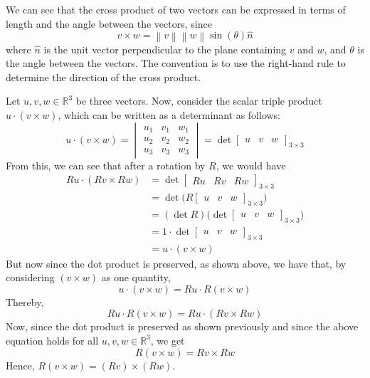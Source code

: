We can see that the cross product of two vectors can be expressed in terms of length and the angle between the vectors, since
\[
    v \times w = \left \| v \right \| \left \| w \right \| \sin(\theta) \hat{n}
\]
where \( \hat{n} \) is the unit vector perpendicular to the plane containing \( v \) and \( w \), and \( \theta \) is the angle between the vectors.
The convention is to use the right-hand rule to determine the direction of the cross product.

Let \( u, v, w \in \mathbb{R}^{3} \) be three vectors.
Now, consider the scalar triple product \( u \cdot (v \times w) \), which can be written as a determinant as follows:
\[
    u \cdot (v \times w)
    =
    \begin{vmatrix}
        u_{1} & v_{1} & w_{1} \\
        u_{2} & v_{2} & w_{2} \\
        u_{3} & v_{3} & w_{3}
    \end{vmatrix}
    =
    \det
    \begin{bmatrix}
        u & v & w
    \end{bmatrix}_{3 \times 3}
\]
From this, we can see that after a rotation by \( R \), we would have
\begin{align*}
    R u \cdot (R v \times R w)
     & =
    \det
    \begin{bmatrix}
        R u & R v & R w
    \end{bmatrix}_{3 \times 3}
    \\ & =
    \det \Big(
    R \begin{bmatrix}
          u & v & w
      \end{bmatrix}_{3 \times 3}
    \Big)
    \\ & =
    (\det R)
    \Big( \det
    \begin{bmatrix}
        u & v & w
    \end{bmatrix}_{3 \times 3} \Big)
    \\ & =
    1 \cdot
    \det
    \begin{bmatrix}
        u & v & w
    \end{bmatrix}_{3 \times 3}
    \\ & =
    u \cdot (v \times w)
\end{align*}
But now since the dot product is preserved, as shown above, we have that, by considering \( (v \times w) \) as one quantity,
\[
    u \cdot (v \times w)
    =
    R u \cdot R (v \times w)
\]
Thereby,
\[
    R u \cdot R (v \times w)
    =
    R u \cdot (R v \times R w)
\]
Now, since the dot product is preserved as shown previously and since the above equation holds for all \( u, v, w \in \mathbb{R}^{3} \), we get
\[
    R (v \times w)
    =
    R v \times R w
\]
Hence, \( \boxed{ R(v \times w) =(R v) \times(R w) } \).

